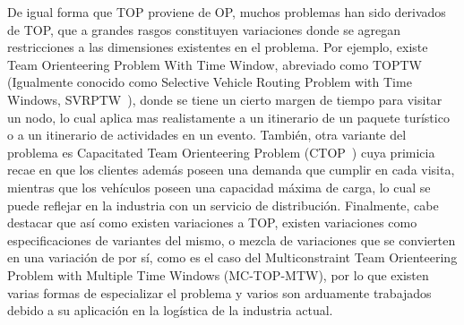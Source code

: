 De igual forma que TOP proviene de OP, muchos problemas han sido derivados de TOP, que a grandes rasgos constituyen variaciones donde se agregan restricciones a las dimensiones existentes en el problema. Por ejemplo, existe Team Orienteering Problem With Time Window, abreviado como TOPTW (Igualmente conocido como Selective Vehicle Routing Problem with Time Windows, SVRPTW~\cite{gueguen1999methodes}), donde se tiene un cierto margen de tiempo para visitar un nodo, lo cual aplica mas realistamente a un itinerario de un paquete tur\'istico o a un itinerario de actividades en un evento. Tambi\'en, otra variante del problema es Capacitated Team Orienteering Problem (CTOP~\cite{doi:10.1057/palgrave.jors.2602603}) cuya primicia recae en que los clientes adem\'as poseen una demanda que cumplir en cada visita, mientras que los veh\'iculos poseen una capacidad m\'axima de carga, lo cual se puede reflejar en la industria con un servicio de distribuci\'on. Finalmente, cabe destacar que as\'i como existen variaciones a TOP, existen variaciones como especificaciones de variantes del mismo, o mezcla de variaciones que se convierten en una variaci\'on de por s\'i, como es el caso del  Multiconstraint Team Orienteering Problem with Multiple Time Windows (MC-TOP-MTW), por lo que existen varias formas de especializar el problema y varios son arduamente trabajados debido a su aplicaci\'on en la log\'istica de la industria actual.
